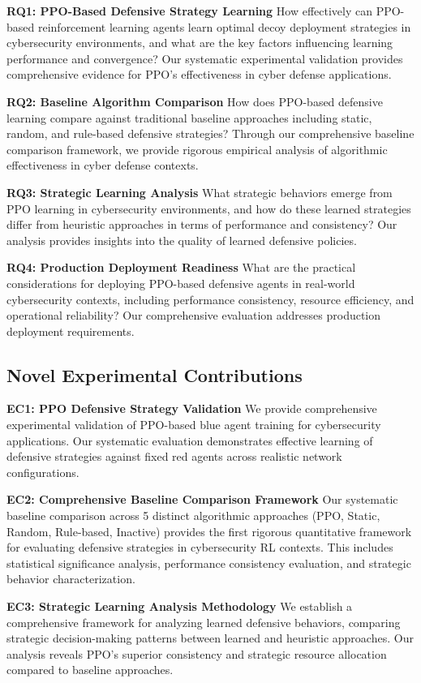 \documentclass[12pt,oneside]{article}
\begin{document}
\textbf{RQ1: PPO-Based Defensive Strategy Learning} 
How effectively can PPO-based reinforcement learning agents learn optimal decoy deployment strategies in cybersecurity environments, and what are the key factors influencing learning performance and convergence? Our systematic experimental validation provides comprehensive evidence for PPO's effectiveness in cyber defense applications.

\textbf{RQ2: Baseline Algorithm Comparison}
How does PPO-based defensive learning compare against traditional baseline approaches including static, random, and rule-based defensive strategies? Through our comprehensive baseline comparison framework, we provide rigorous empirical analysis of algorithmic effectiveness in cyber defense contexts.

\textbf{RQ3: Strategic Learning Analysis}
What strategic behaviors emerge from PPO learning in cybersecurity environments, and how do these learned strategies differ from heuristic approaches in terms of performance and consistency? Our analysis provides insights into the quality of learned defensive policies.

\textbf{RQ4: Production Deployment Readiness}
What are the practical considerations for deploying PPO-based defensive agents in real-world cybersecurity contexts, including performance consistency, resource efficiency, and operational reliability? Our comprehensive evaluation addresses production deployment requirements.

\subsection{Novel Experimental Contributions}

\textbf{EC1: PPO Defensive Strategy Validation}
We provide comprehensive experimental validation of PPO-based blue agent training for cybersecurity applications. Our systematic evaluation demonstrates effective learning of defensive strategies against fixed red agents across realistic network configurations.

\textbf{EC2: Comprehensive Baseline Comparison Framework}
Our systematic baseline comparison across 5 distinct algorithmic approaches (PPO, Static, Random, Rule-based, Inactive) provides the first rigorous quantitative framework for evaluating defensive strategies in cybersecurity RL contexts. This includes statistical significance analysis, performance consistency evaluation, and strategic behavior characterization.

\textbf{EC3: Strategic Learning Analysis Methodology}
We establish a comprehensive framework for analyzing learned defensive behaviors, comparing strategic decision-making patterns between learned and heuristic approaches. Our analysis reveals PPO's superior consistency and strategic resource allocation compared to baseline approaches.
\end{document}
